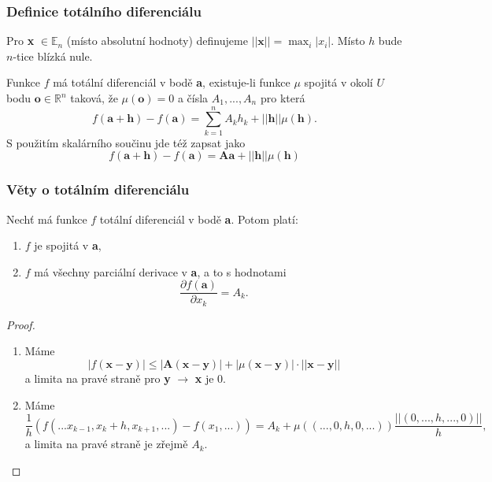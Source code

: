 \documentclass[../main.tex]{subfiles}
\begin{document}
\subsubsection{Definice totálního diferenciálu}
Pro \textbf{x} $\in \mathbb{E}_n$ (místo absolutní hodnoty) definujeme \(||\textbf{x}||  = \max_i|x_i|\). Místo $h$ bude $n$-tice blízká nule.

\begin{definition}
	Funkce $f$ má totální diferenciál v bodě \textbf{a}, existuje-li funkce $\mu$ spojitá v okolí $U$ bodu $\textbf{o} \in \mathbb{R}^n$ taková, že $\mu(\textbf{o}) = 0$
	a čísla $A_1,...,A_n$ pro která
	\[f(\textbf{a}+\textbf{h}) - f(\textbf{a}) = \sum^n_{k=1}A_kh_k+||\textbf{h}||\mu(\textbf{h}).\]
	S použitím skalárního součinu jde též zapsat jako
	$$f(\textbf{a} + \textbf{h}) - f(\textbf{a}) = \textbf{Aa} + ||\textbf{h}|| \mu (\textbf{h})$$
\end{definition}

\subsubsection{Věty o totálním diferenciálu}

\begin{lemma}
	Nechť má funkce $f$ totální diferenciál v bodě \textbf{a}. Potom platí:
	\begin{enumerate}
	    \item $f$ je spojitá v \textbf{a},
	    \item $f$ má všechny parciální derivace v \textbf{a}, a to s hodnotami 
	    \[\frac{\partial f(\textbf{a})}{\partial x_k} = A_k.\]
	\end{enumerate}
\end{lemma}

\begin{proof}
	\begin{enumerate}
		\item Máme \[|f(\textbf{x}-\textbf{y})| \leq |\textbf{A}(\textbf{x}-\textbf{y})| + |\mu(\textbf{x}-\textbf{y})|\cdot||\textbf{x}-\textbf{y}||\]
		a limita na pravé straně pro \textbf{y} $\rightarrow$ \textbf{x} je 0.
		\item Máme \[\frac{1}{h}(f(...x_{k-1},x_k+h,x_{k+1},...) - f(x_1,...)) = A_k + \mu((...,0,h,0,...))\frac{||(0,...,h,...,0)||}{h},\]
		a limita na pravé straně je zřejmě $A_k$.
	\end{enumerate}
\end{proof}
\end{document}
